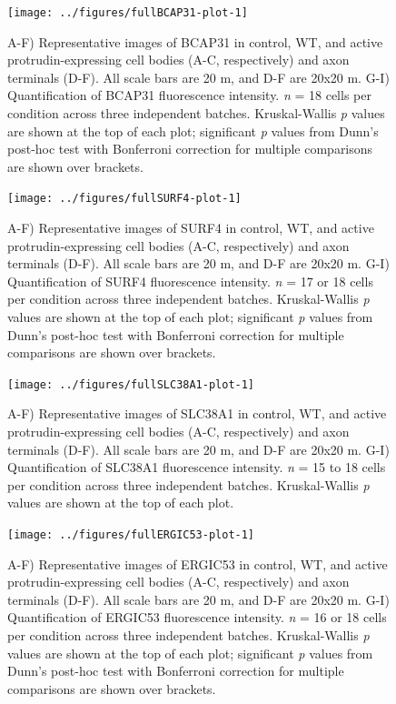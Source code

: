 \documentclass[
  12pt,
  a4paper,
]{book}
\begin{document}
\begin{figure}[H]
\texttt{[image: ../figures/fullBCAP31-plot-1]} \caption[BCAP31 localisation in protrudin-expressing neurons]{A-F) Representative images of BCAP31 in control, WT, and active protrudin-expressing cell bodies (A-C, respectively) and axon terminals (D-F). All scale bars are 20 \textmu{}m, and D-F are 20x20 \textmu{}m. G-I) Quantification of BCAP31 fluorescence intensity. \emph{n} = 18 cells per condition across three independent batches. Kruskal-Wallis \emph{p} values are shown at the top of each plot; significant \emph{p} values from Dunn's post-hoc test with Bonferroni correction for multiple comparisons are shown over brackets.}\label{fig:BCAP31-plot}
\end{figure}



\begin{figure}[H]
\texttt{[image: ../figures/fullSURF4-plot-1]} \caption[SURF4 localisation in protrudin-expressing neurons]{A-F) Representative images of SURF4 in control, WT, and active protrudin-expressing cell bodies (A-C, respectively) and axon terminals (D-F). All scale bars are 20 \textmu{}m, and D-F are 20x20 \textmu{}m. G-I) Quantification of SURF4 fluorescence intensity. \emph{n} = 17 or 18 cells per condition across three independent batches. Kruskal-Wallis \emph{p} values are shown at the top of each plot; significant \emph{p} values from Dunn's post-hoc test with Bonferroni correction for multiple comparisons are shown over brackets.}\label{fig:SURF4-plot}
\end{figure}



\begin{figure}[H]
\texttt{[image: ../figures/fullSLC38A1-plot-1]} \caption[SLC38A1 localisation in protrudin-expressing neurons]{A-F) Representative images of SLC38A1 in control, WT, and active protrudin-expressing cell bodies (A-C, respectively) and axon terminals (D-F). All scale bars are 20 \textmu{}m, and D-F are 20x20 \textmu{}m. G-I) Quantification of SLC38A1 fluorescence intensity. \emph{n} = 15 to 18 cells per condition across three independent batches. Kruskal-Wallis \emph{p} values are shown at the top of each plot.}\label{fig:SLC38A1-plot}
\end{figure}



\begin{figure}[H]
\texttt{[image: ../figures/fullERGIC53-plot-1]} \caption[ERGIC53 localisation in protrudin-expressing neurons]{A-F) Representative images of ERGIC53 in control, WT, and active protrudin-expressing cell bodies (A-C, respectively) and axon terminals (D-F). All scale bars are 20 \textmu{}m, and D-F are 20x20 \textmu{}m. G-I) Quantification of ERGIC53 fluorescence intensity. \emph{n} = 16 or 18 cells per condition across three independent batches. Kruskal-Wallis \emph{p} values are shown at the top of each plot; significant \emph{p} values from Dunn's post-hoc test with Bonferroni correction for multiple comparisons are shown over brackets.}\label{fig:ERGIC53-plot}
\end{figure}
\end{document}
